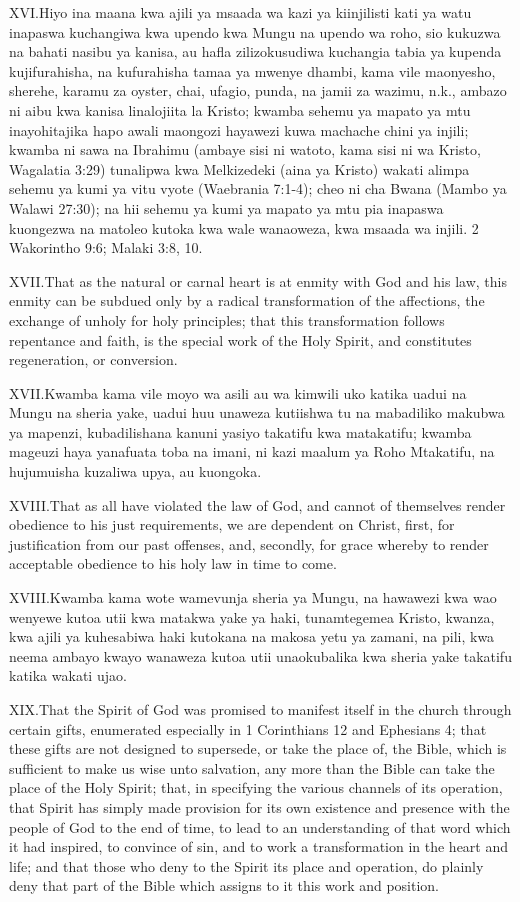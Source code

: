 \lettrine{XVI.} Hiyo ina maana kwa ajili ya msaada wa kazi ya kiinjilisti kati ya watu inapaswa kuchangiwa kwa upendo kwa Mungu na upendo wa roho, sio kukuzwa na bahati nasibu ya kanisa, au hafla zilizokusudiwa kuchangia tabia ya kupenda kujifurahisha, na kufurahisha tamaa ya mwenye dhambi, kama vile maonyesho, sherehe, karamu za oyster, chai, ufagio, punda, na jamii za wazimu, n.k., ambazo ni aibu kwa kanisa linalojiita la Kristo; kwamba sehemu ya mapato ya mtu inayohitajika hapo awali maongozi hayawezi kuwa machache chini ya injili; kwamba ni sawa na Ibrahimu (ambaye sisi ni watoto, kama sisi ni wa Kristo, Wagalatia 3:29) tunalipwa kwa Melkizedeki (aina ya Kristo) wakati alimpa sehemu ya kumi ya vitu vyote (Waebrania 7:1-4); cheo ni cha Bwana (Mambo ya Walawi 27:30); na hii sehemu ya kumi ya mapato ya mtu pia inapaswa kuongezwa na matoleo kutoka kwa wale wanaoweza, kwa msaada wa injili. 2 Wakorintho 9:6; Malaki 3:8, 10.


\lettrine{XVII.} That as the natural or carnal heart is at enmity with God and his law, this enmity can be subdued only by a radical transformation of the affections, the exchange of unholy for holy principles; that this transformation follows repentance and faith, is the special work of the Holy Spirit, and constitutes regeneration, or conversion.


\lettrine{XVII.} Kwamba kama vile moyo wa asili au wa kimwili uko katika uadui na Mungu na sheria yake, uadui huu unaweza kutiishwa tu na mabadiliko makubwa ya mapenzi, kubadilishana kanuni yasiyo takatifu kwa matakatifu; kwamba mageuzi haya yanafuata toba na imani, ni kazi maalum ya Roho Mtakatifu, na hujumuisha kuzaliwa upya, au kuongoka.


\lettrine{XVIII.} That as all have violated the law of God, and cannot of themselves render obedience to his just requirements, we are dependent on Christ, first, for justification from our past offenses, and, secondly, for grace whereby to render acceptable obedience to his holy law in time to come.


\lettrine{XVIII.} Kwamba kama wote wamevunja sheria ya Mungu, na hawawezi kwa wao wenyewe kutoa utii kwa matakwa yake ya haki, tunamtegemea Kristo, kwanza, kwa ajili ya kuhesabiwa haki kutokana na makosa yetu ya zamani, na pili, kwa neema ambayo kwayo wanaweza kutoa utii unaokubalika kwa sheria yake takatifu katika wakati ujao.


\lettrine{XIX.} That the Spirit of God was promised to manifest itself in the church through certain gifts, enumerated especially in 1 Corinthians 12 and Ephesians 4; that these gifts are not designed to supersede, or take the place of, the Bible, which is sufficient to make us wise unto salvation, any more than the Bible can take the place of the Holy Spirit; that, in specifying the various channels of its operation, that Spirit has simply made provision for its own existence and presence with the people of God to the end of time, to lead to an understanding of that word which it had inspired, to convince of sin, and to work a transformation in the heart and life; and that those who deny to the Spirit its place and operation, do plainly deny that part of the Bible which assigns to it this work and position.


